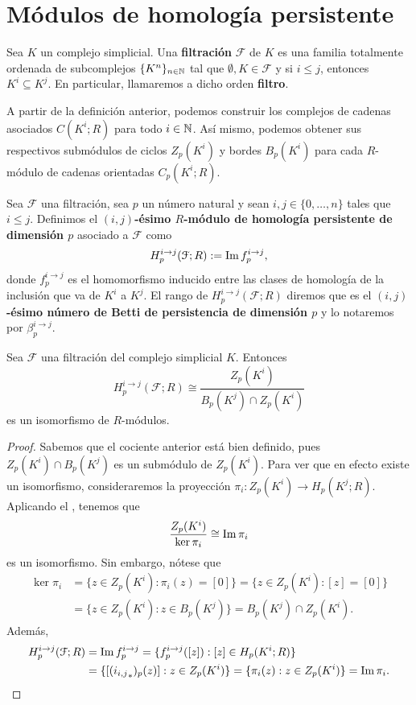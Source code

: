 \section{Módulos de homología persistente}



\begin{definicion}
	Sea \(K\) un complejo simplicial. Una \textbf{filtración} \(\mathcal{F}\) de \(K\) es una familia totalmente ordenada de subcomplejos \(\{K^n\}_{n \in \mathbb{N}}\) tal que \(\emptyset, K \in \mathcal{F}\) y si \(i \leq j\), entonces \(K^i \subseteq K^j\). En particular, llamaremos a dicho orden \textbf{filtro}.
\end{definicion}
A partir de la definición anterior, podemos construir los complejos de cadenas asociados \(C(K^i;R)\) para todo \(i \in \mathbb{N}\). Así mismo, podemos obtener sus respectivos submódulos de ciclos \(Z_p(K^i)\) y bordes \(B_p(K^i)\) para cada $R$-módulo de cadenas orientadas \(C_p(K^i;R)\).
\begin{definicion}
	Sea \(\mathcal{F}\) una filtración, sea \(p\) un número natural y sean \(i,j \in \{0, \dots, n\}\) tales que $i \leq j$. Definimos el  \textbf{\((i,j)\)-ésimo \(R\)-módulo de homología persistente de dimensión \(p\)} asociado a \(\mathcal{F}\) como
	\[
		H_p^{i \to j}(\mathcal{F};R) := \operatorname{Im} f_p^{i \to j},
	\]
	donde $f_p^{i \to j}$ es el homomorfismo inducido entre las clases de homología de la inclusión que va de $K^i$ a $K^j$. El rango de \(H_p^{i \to j}(\mathcal{F};R)\) diremos que es el \textbf{\((i,j)\)-ésimo número de Betti de persistencia de dimensión \(p\)} y lo notaremos por \(\beta_p^{i \to j}\).
\end{definicion}
\begin{proposicion}
	Sea \(\mathcal{F}\) una filtración del complejo simplicial \(K\). Entonces
	\[
		H_p^{i \to j}(\mathcal{F};R) \cong \frac{Z_p(K^i)}{B_p(K^j) \cap Z_p(K^i)}
	\]
	es un isomorfismo de \(R\)-módulos.
\end{proposicion}
\begin{proof}
	Sabemos que el cociente anterior está bien definido, pues \(Z_p(K^i) \cap B_p(K^j)\) es un submódulo de \(Z_p(K^i)\). Para ver que en efecto existe un isomorfismo, consideraremos la proyección \(\pi_i : Z_p(K^i) \to H_p(K^j;R)\). Aplicando el , tenemos que 
	\[
		\frac{Z_p(K^i)}{\ker \pi_i} \cong \operatorname{Im} \pi_i
	\]
	es un isomorfismo. Sin embargo, nótese que
	\begin{align*}
		\ker \pi_i &= \{z \in Z_p(K^i) : \pi_i(z) = [0] \}
				   = \{z \in Z_p(K^i) : [z] = [0] \} \\ 
				   &= \{z \in Z_p(K^i) : z \in B_p(K^j) \}
				   = B_p(K^j) \cap Z_p(K^i).
	\end{align*}
	Además, 
	\begin{align*}
		H_p^{i \to j}(\mathcal{F};R) &= \operatorname{Im} f_p^{i \to j} = \{f_p^{i \to j}([z]) : [z] \in H_p(K^i;R) \} \\ 
							   &= \{[({i_{i,j}}_*)_p(z)] : z \in Z_p(K^i) \}  
							   = \{\pi_i(z) : z \in Z_p(K^i) \} 
							   = \operatorname{Im} \pi_i.
	\end{align*}
\end{proof}
